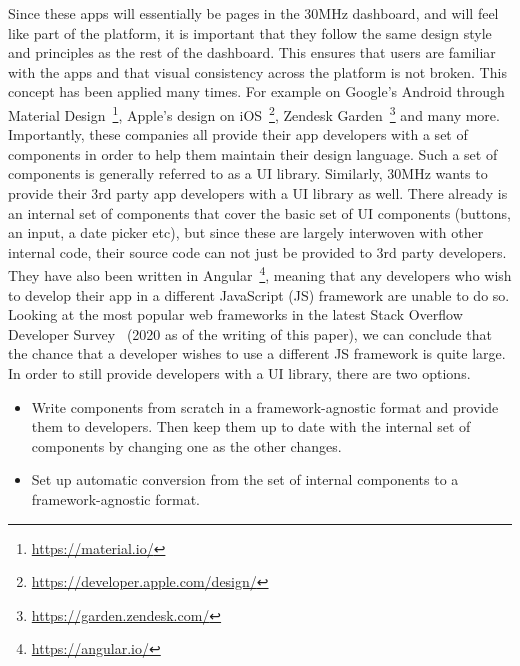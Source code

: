 Since these apps will essentially be pages in the 30MHz dashboard, and will feel like part of the platform, it is important that they follow the same design style and principles as the rest of the dashboard. This ensures that users are familiar with the apps and that visual consistency across the platform is not broken. This concept has been applied many times. For example on Google's Android through Material Design~\footnote{\url{https://material.io/}}, Apple's design on iOS~\footnote{\url{https://developer.apple.com/design/}}, Zendesk Garden~\footnote{\url{https://garden.zendesk.com/}} and many more. Importantly, these companies all provide their app developers with a set of components in order to help them maintain their design language. Such a set of components is generally referred to as a UI library. Similarly, 30MHz wants to provide their 3rd party app developers with a UI library as well. There already is an internal set of components that cover the basic set of UI components (buttons, an input, a date picker etc), but since these are largely interwoven with other internal code, their source code can not just be provided to 3rd party developers. They have also been written in Angular~\footnote{\url{https://angular.io/}}, meaning that any developers who wish to develop their app in a different JavaScript (JS) framework are unable to do so. Looking at the most popular web frameworks in the latest Stack Overflow Developer Survey~\cite{stack-overflow-dev-survey} (2020 as of the writing of this paper), we can conclude that the chance that a developer wishes to use a different JS framework is quite large. In order to still provide developers with a UI library, there are two options.

\begin{itemize}
	\item Write components from scratch in a framework-agnostic format and provide them to developers. Then keep them up to date with the internal set of components by changing one as the other changes.
	\item Set up automatic conversion from the set of internal components to a framework-agnostic format.
\end{itemize}

